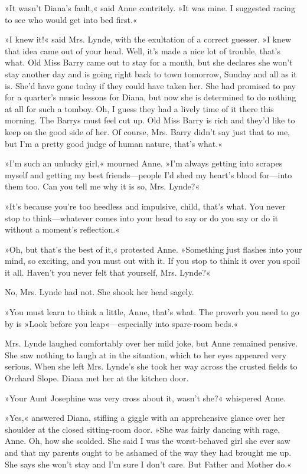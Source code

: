 »It wasn’t Diana’s fault,« said Anne contritely. »It was mine. I suggested racing to see who would get into bed first.«

»I knew it!« said Mrs. Lynde, with the exultation of a correct guesser. »I knew that idea came out of your head. Well, it’s made a nice lot of trouble, that’s what. Old Miss Barry came out to stay for a month, but she declares she won’t stay another day and is going right back to town tomorrow, Sunday and all as it is. She’d have gone today if they could have taken her. She had promised to pay for a quarter’s music lessons for Diana, but now she is determined to do nothing at all for such a tomboy. Oh, I guess they had a lively time of it there this morning. The Barrys must feel cut up. Old Miss Barry is rich and they’d like to keep on the good side of her. Of course, Mrs. Barry didn’t say just that to me, but I’m a pretty good judge of human nature, that’s what.«

»I’m such an unlucky girl,« mourned Anne. »I’m always getting into scrapes myself and getting my best friends—people I’d shed my heart’s blood for—into them too. Can you tell me why it is so, Mrs. Lynde?«

»It’s because you’re too heedless and impulsive, child, that’s what. You never stop to think—whatever comes into your head to say or do you say or do it without a moment’s reflection.«

»Oh, but that’s the best of it,« protested Anne. »Something just flashes into your mind, so exciting, and you must out with it. If you stop to think it over you spoil it all. Haven’t you never felt that yourself, Mrs. Lynde?«

No, Mrs. Lynde had not. She shook her head sagely.

»You must learn to think a little, Anne, that’s what. The proverb you need to go by is »Look before you leap«—especially into spare-room beds.«

Mrs. Lynde laughed comfortably over her mild joke, but Anne remained pensive. She saw nothing to laugh at in the situation, which to her eyes appeared very serious. When she left Mrs. Lynde’s she took her way across the crusted fields to Orchard Slope. Diana met her at the kitchen door.

»Your Aunt Josephine was very cross about it, wasn’t she?« whispered Anne.

»Yes,« answered Diana, stifling a giggle with an apprehensive glance over her shoulder at the closed sitting-room door. »She was fairly dancing with rage, Anne. Oh, how she scolded. She said I was the worst-behaved girl she ever saw and that my parents ought to be ashamed of the way they had brought me up. She says she won’t stay and I’m sure I don’t care. But Father and Mother do.«

